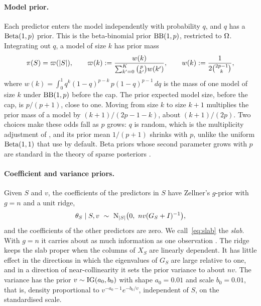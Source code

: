 \paragraph{Model prior.} Each predictor enters the model independently with probability $q$, and $q$ has a
$\mathrm{Beta}(1,p)$ prior. This is the beta-binomial prior $\mathrm{BB}(1,p)$, restricted to $\Omega$. Integrating out $q$, a model
of size $k$ has prior mass
\begin{equation}\label{eq:modelprior}
  \pi(S)=\varpi(\lvert S\rvert),\qquad \varpi(k):=\frac{w(k)}{\sum_{k'=0}^{K}\binom p{k'}w(k')},\qquad
  w(k):=\frac{1}{2\binom{2p-1}{k}},
\end{equation}
where $w(k)=\int_0^1q^k(1-q)^{p-k}\,p(1-q)^{p-1}\,dq$ is the mass of one model of size $k$ under $\mathrm{BB}(1,p)$ before
the cap. The prior expected model size, before the cap, is $p/(p+1)$, close to one. Moving from size $k$ to size $k+1$
multiplies the prior mass of a model by $(k+1)/(2p-1-k)$, about $(k+1)/(2p)$. Two choices make these odds fall as $p$
grows: $q$ is random, which is the multiplicity adjustment of \citet{ScottBerger2010}, and its prior mean $1/(p+1)$
shrinks with $p$, unlike the uniform $\mathrm{Beta}(1,1)$ that \citet{ScottBerger2010} use by default. Beta priors whose
second parameter grows with $p$ are standard in the theory of sparse posteriors
\citep{CastilloVanDerVaart2012,CastilloSchmidtHieberVanDerVaart2015}.

\paragraph{Coefficient and variance priors.} Given $S$ and $v$, the coefficients of the predictors in $S$ have
Zellner's $g$-prior \citep{Zellner1986} with $g=n$ and a unit ridge,
\begin{equation}\label{eq:slab}
  \theta_S\mid S,v\ \sim\ \Normal_{\abs S}\big(0,\ nv(G_S+I)^{-1}\big),
\end{equation}
and the coefficients of the other predictors are zero. We call~\eqref{eq:slab} the \emph{slab}. With $g=n$ it carries
about as much information as one observation \citep{KassWasserman1995}. The ridge keeps the slab proper when the
columns of $X_S$ are linearly dependent. It has little effect in the directions in which the eigenvalues of $G_S$ are
large relative to one, and in a direction of near-collinearity it sets the prior variance to about $nv$. The
variance has the prior $v\sim\mathrm{IG}(a_0,b_0)$ with shape $a_0=0.01$ and scale $b_0=0.01$, that is, density
proportional to $v^{-a_0-1}e^{-b_0/v}$, independent of $S$, on the standardised scale.


